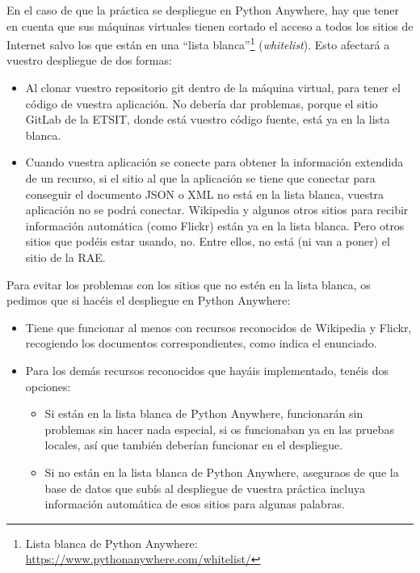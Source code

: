 En el caso de que la práctica se despliegue en Python Anywhere, hay que tener en cuenta que sus máquinas virtuales tienen cortado el acceso a todos los sitios de Internet salvo los que están en una ``lista blanca''\footnote{Lista blanca de Python Anywhere: \url{https://www.pythonanywhere.com/whitelist/}} (\emph{whitelist}). Esto afectará a vuestro despliegue de dos formas:

\begin{itemize}
\item Al clonar vuestro repositorio git dentro de la máquina virtual, para tener el código de vuestra aplicación. No debería dar problemas, porque el sitio GitLab de la ETSIT, donde está vuestro código fuente, está ya en la lista blanca.
\item Cuando vuestra aplicación se conecte para obtener la información extendida de un recurso, si el sitio al que la aplicación se tiene que conectar para conseguir el documento JSON o XML no está en la lista blanca, vuestra aplicación no se podrá conectar. Wikipedia y algunos otros sitios para recibir información automática (como Flickr) están ya en la lista blanca. Pero otros sitios que podéis estar usando, no. Entre ellos, no está (ni van a poner) el sitio de la RAE.
\end{itemize}

Para evitar los problemas con los sitios que no estén en la lista blanca, os pedimos que si hacéis el despliegue en Python Anywhere:

\begin{itemize}
\item Tiene que funcionar al menos con recursos reconocidos de Wikipedia y Flickr, recogiendo los documentos correspondientes, como indica el enunciado.
\item Para los demás recursos reconocidos que hayáis implementado, tenéis dos opciones:
  \begin{itemize}
  \item Si están en la lista blanca de Python Anywhere, funcionarán sin problemas sin hacer nada especial, si os funcionaban ya en las pruebas locales, así que también deberían funcionar en el despliegue.
  \item Si no están en la lista blanca de Python Anywhere, aseguraos de que la base de datos que subís al despliegue de vuestra práctica incluya información automática de esos sitios para algunas palabras.
  \end{itemize}
\end{itemize}

